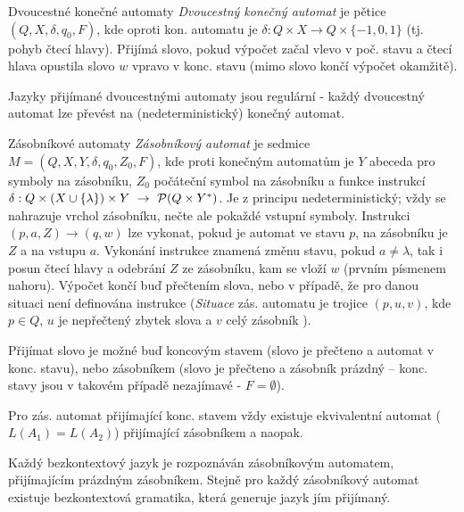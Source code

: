 \begin{definiceN}{Dvoucestné konečné automaty}
\emph{Dvoucestný konečný automat} je pětice $(Q,X,\delta,q_0,F)$, kde oproti kon. automatu je $\delta:Q\times X\to Q\times \{-1,0,1\}$ (tj. pohyb čtecí hlavy). Přijímá slovo, pokud výpočet začal vlevo v poč. stavu a čtecí hlava opustila slovo $w$ vpravo v konc. stavu (mimo slovo končí výpočet okamžitě).
\end{definiceN}
\begin{poznamka}
Jazyky přijímané dvoucestnými automaty jsou regulární - každý dvoucestný automat lze převést na (nedeterministický) konečný automat.
\end{poznamka}


\begin{definiceN}{Zásobníkové automaty}
\emph{Zásobníkový automat} je sedmice $M=(Q,X,Y,\delta,q_0,Z_0,F)$, kde proti konečným automatům je $Y$ abeceda pro symboly na zásobníku, $Z_0$ počáteční symbol na zásobníku a funkce instrukcí $\delta:Q\times(X\cup\{\lambda\})\times Y\ \to\ \c{P}(Q\times Y^{\ast})$. Je z principu nedeterministický; vždy se nahrazuje vrchol zásobníku, nečte ale pokaždé vstupní symboly. Instrukci $(p,a,Z)\to(q,w)$ lze vykonat, pokud je automat ve stavu $p$, na zásobníku je $Z$ a na vstupu $a$. Vykonání instrukce znamená změnu stavu, pokud $a\neq\lambda$, tak i posun čtecí hlavy a odebrání $Z$ ze zásobníku, kam se vloží $w$ (prvním písmenem nahoru). Výpočet končí buď přečtením slova, nebo v případě, že pro danou situaci není definována instrukce
(\emph{Situace} zás. automatu je trojice $(p,u,v)$, kde $p\in Q$, $u$ je nepřečtený zbytek slova a $v$ celý zásobník ).

Přijímat slovo je možné buď koncovým stavem (slovo je přečteno a automat v konc. stavu), nebo zásobníkem (slovo je přečteno a zásobník prázdný -- konc. stavy jsou v takovém případě nezajímavé - $F=\emptyset$).
\end{definiceN}

\begin{poznamka}
Pro zás. automat přijímající konc. stavem vždy existuje ekvivalentní automat ($L(A_1)=L(A_2)$) přijímající zásobníkem a naopak.
\end{poznamka}

\begin{veta}
Každý bezkontextový jazyk je rozpoznáván zásobníkovým automatem, přijímajícím prázdným zásobníkem. Stejně pro každý zásobníkový automat existuje bezkontextová gramatika, která generuje jazyk jím přijímaný.
\end{veta}

